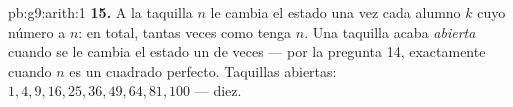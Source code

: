 \begin{solution}{pb:g9:arith:1}
\textbf{15.} A la taquilla $n$ le cambia el estado una vez cada alumno $k$
cuyo número  a $n$: en total, tantas veces como 
tenga $n$. Una taquilla acaba \emph{abierta} cuando se le cambia el estado un  de veces --- por la pregunta 14, exactamente cuando $n$ es un
cuadrado perfecto. Taquillas abiertas: $1, 4, 9, 16, 25, 36, 49, 64,
81, 100$ --- diez.
\end{solution}
